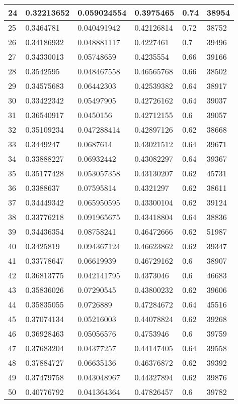 \begin{longtable}{|l|l|l|l|l|l|}
24 & 0.32213652 & 0.059024554 & 0.3975465 & 0.74 & 38954 \\ \hline 
25 & 0.3464781 & 0.040491942 & 0.42126814 & 0.72 & 38752 \\ \hline 
26 & 0.34186932 & 0.048881117 & 0.4227461 & 0.7 & 39496 \\ \hline 
27 & 0.34330013 & 0.05748659 & 0.4235554 & 0.66 & 39166 \\ \hline 
28 & 0.3542595 & 0.048467558 & 0.46565768 & 0.66 & 38502 \\ \hline 
29 & 0.34575683 & 0.06442303 & 0.42539382 & 0.64 & 38917 \\ \hline 
30 & 0.33422342 & 0.05497905 & 0.42726162 & 0.64 & 39037 \\ \hline 
31 & 0.36540917 & 0.0450156 & 0.42712155 & 0.6 & 39057 \\ \hline 
32 & 0.35109234 & 0.047288414 & 0.42897126 & 0.62 & 38668 \\ \hline 
33 & 0.3449247 & 0.0687614 & 0.43021512 & 0.64 & 39671 \\ \hline 
34 & 0.33888227 & 0.06932442 & 0.43082297 & 0.64 & 39367 \\ \hline 
35 & 0.35177428 & 0.053057358 & 0.43130207 & 0.62 & 45731 \\ \hline 
36 & 0.3388637 & 0.07595814 & 0.4321297 & 0.62 & 38611 \\ \hline 
37 & 0.34449342 & 0.065950595 & 0.43300104 & 0.62 & 39124 \\ \hline 
38 & 0.33776218 & 0.091965675 & 0.43418804 & 0.64 & 38836 \\ \hline 
39 & 0.34436354 & 0.08758241 & 0.46472666 & 0.62 & 51987 \\ \hline 
40 & 0.3425819 & 0.094367124 & 0.46623862 & 0.62 & 39347 \\ \hline 
41 & 0.33778647 & 0.06619939 & 0.46729162 & 0.6 & 38907 \\ \hline 
42 & 0.36813775 & 0.042141795 & 0.4373046 & 0.6 & 46683 \\ \hline 
43 & 0.35836026 & 0.07290545 & 0.43800232 & 0.62 & 39606 \\ \hline 
44 & 0.35835055 & 0.0726889 & 0.47284672 & 0.64 & 45516 \\ \hline 
45 & 0.37074134 & 0.05216003 & 0.44078824 & 0.62 & 39268 \\ \hline 
46 & 0.36928463 & 0.05056576 & 0.4753946 & 0.6 & 39759 \\ \hline 
47 & 0.37683204 & 0.04377257 & 0.44147405 & 0.64 & 39558 \\ \hline 
48 & 0.37884727 & 0.06635136 & 0.46376872 & 0.62 & 39392 \\ \hline 
49 & 0.37479758 & 0.043048967 & 0.44327894 & 0.62 & 39876 \\ \hline 
50 & 0.40776792 & 0.041364364 & 0.47826457 & 0.6 & 39782 \\ \hline 
\end{longtable}